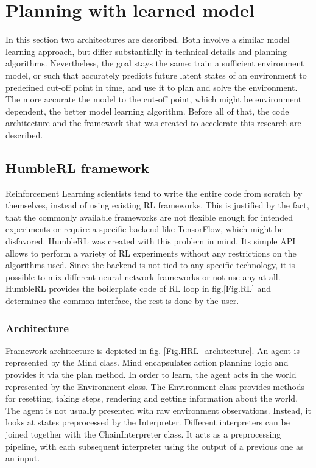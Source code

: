\section{Planning with learned model}

In this section two architectures are described. Both involve a similar model learning approach, but differ substantially in technical details and planning algorithms. Nevertheless, the goal stays the same: train a sufficient environment model, or such that accurately predicts future latent states of an environment to predefined cut-off point in time, and use it to plan and solve the environment. The more accurate the model to the cut-off point, which might be environment dependent, the better model learning algorithm.
Before all of that, the code architecture and the framework that was created to accelerate this research are described.

\subsection{HumbleRL framework}

Reinforcement Learning scientists tend to write the entire code from scratch by themselves, instead of using existing RL frameworks. This is justified by the fact, that the commonly available frameworks are not flexible enough for intended experiments or require a specific backend like TensorFlow, which might be disfavored.
HumbleRL \cite{Code.HRL} was created with this problem in mind. Its simple API allows to perform a variety of RL experiments without any restrictions on the algorithms used. Since the backend is not tied to any specific technology, it is possible to mix different neural network frameworks or not use any at all. HumbleRL provides the boilerplate code of RL loop in fig.\ref{Fig.RL} and determines the common interface, the rest is done by the user.

\subsubsection{Architecture}
Framework architecture is depicted in fig. \ref{Fig.HRL_architecture}. An agent is represented by the Mind class. Mind encapsulates action planning logic and provides it via the plan method. In order to learn, the agent acts in the world represented by the Environment class. The Environment class provides methods for resetting, taking steps, rendering and getting information about the world. The agent is not usually presented with raw environment observations. Instead, it looks at states preprocessed by the Interpreter. Different interpreters can be joined together with the ChainInterpreter class. It acts as a preprocessing pipeline, with each subsequent interpreter using the output of a previous one as an input.

